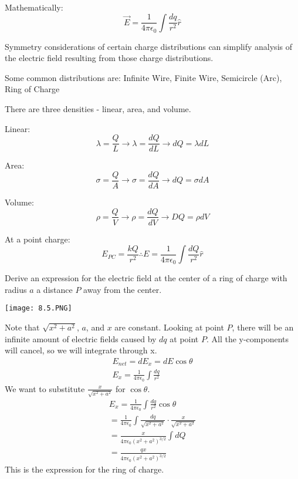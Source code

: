 \documentclass[../em.tex]{subfiles}
\begin{document}
Mathematically:
\[\vec{E}=\frac{1}{4\pi\epsilon_0}\int\frac{dq}{r^2}\hat{r}\]

Symmetry considerations of certain charge distributions can simplify analysis of the electric field resulting from those charge distributions.

Some common distributions are: Infinite Wire, Finite Wire, Semicircle (Arc), Ring of Charge 

There are three densities - linear, area, and volume. 

Linear: 
\[\lambda=\frac{Q}{L}\longrightarrow \lambda = \frac{dQ}{dL} \longrightarrow dQ=\lambda dL\]

Area: 
\[\sigma=\frac{Q}{A}\longrightarrow \sigma = \frac{dQ}{dA}\longrightarrow dQ=\sigma dA\]

Volume: 
\[\rho = \frac{Q}{V}\longrightarrow \rho = \frac{dQ}{dV} \longrightarrow DQ=\rho dV\]

At a point charge:
\[E_{PC}=\frac{kQ}{r^2} \therefore E=\frac{1}{4\pi\epsilon_0}\int \frac{dQ}{r^2}\hat{r}\]

\pagebreak
\begin{example}
    Derive an expression for the electric field at the center of a ring of charge with radius $a$ a distance $P$ away from the center.
    \begin{center}
        \texttt{[image: 8.5.PNG]}
    \end{center}
    Note that $\sqrt{x^2+a^2}$, $a$, and $x$ are constant. 
    \smallbreak
    Looking at point $P$, there will be an infinite amount of electric fields caused by $dq$ at point $P$.
    \smallbreak
    All the y-components will cancel, so we will integrate through x.
    \begin{align*}
        E_{net}=dE_x=dE\cos\theta
        \\
        E_x=\frac{1}{4\pi\epsilon_0}\int\frac{dq}{r^2}
    \end{align*}
    We want to substitute $\frac{x}{\sqrt{x^2+a^2}}$ for $\cos\theta$.
    \begin{align*}
        E_x=\frac{1}{4\pi\epsilon_0}\int\frac{dq}{r^2}\cos\theta
        \\
        =\frac{1}{4\pi\epsilon_0}\int\frac{dq}{\sqrt{x^2+a^2}}\cdot\frac{x}{\sqrt{x^2+a^2}}
        \\
        =\frac{x}{4\pi\epsilon_0(x^2+a^2)^{3/2}}\int{dQ}
        \\
        =\frac{qx}{4\pi\epsilon_0(x^2+a^2)^{3/2}}
    \end{align*}
    This is the expression for the ring of charge. 
\end{example}
\end{document}
